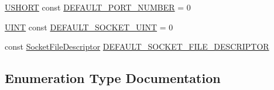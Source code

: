 \begin{DoxyCompactItemize}
\item 
\hyperlink{typedefs_8h_a5b86282b5437f326bad1198f30248a54}{U\+S\+H\+O\+R\+T} const \hyperlink{namespace_communication_a0d87c8548d0e93a99a42f1f394e2684b}{D\+E\+F\+A\+U\+L\+T\+\_\+\+P\+O\+R\+T\+\_\+\+N\+U\+M\+B\+E\+R} = 0
\item 
\hyperlink{typedefs_8h_a2e2c38961834f28c06e17e074eb00bc7}{U\+I\+N\+T} const \hyperlink{namespace_communication_a4126a74768d9570f9f2eb8e986c13586}{D\+E\+F\+A\+U\+L\+T\+\_\+\+S\+O\+C\+K\+E\+T\+\_\+\+U\+I\+N\+T} = 0
\item 
const \hyperlink{class_communication_1_1_socket_file_descriptor}{Socket\+File\+Descriptor} \hyperlink{namespace_communication_a50811f12e697a4a127b9d97dfdea96b4}{D\+E\+F\+A\+U\+L\+T\+\_\+\+S\+O\+C\+K\+E\+T\+\_\+\+F\+I\+L\+E\+\_\+\+D\+E\+S\+C\+R\+I\+P\+T\+O\+R}
\end{DoxyCompactItemize}


\subsection{Enumeration Type Documentation}
\hypertarget{namespace_communication_a8dc059cf785da5e0d245141c4f8a6a9c}{}
